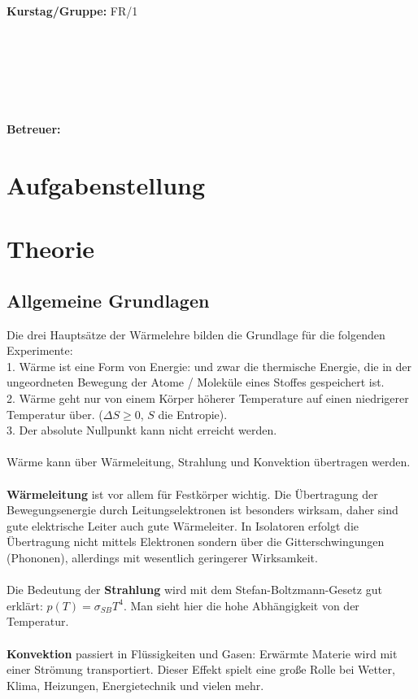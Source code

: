 \documentclass[12pt,a4paper,twopage]{article}
\begin{document}
\begin{verbatim}


\end{verbatim}
			\begin{flushleft}
			\textbf{\Large{Kurstag/Gruppe:}} \Large{FR/1}
			\end{flushleft}

\begin{verbatim}






\end{verbatim}
			\begin{flushleft}
			\LARGE{\textbf{Betreuer:\Large{ }}}		
			\end{flushleft}
			
\section{Aufgabenstellung}

\section{Theorie}
\subsection{Allgemeine Grundlagen}
Die drei Hauptsätze der Wärmelehre bilden die Grundlage für die folgenden Experimente:\\
1. Wärme ist eine Form von Energie: und zwar die thermische Energie, die in der ungeordneten Bewegung der Atome / Moleküle eines Stoffes gespeichert ist.\\
2. Wärme geht nur von einem Körper höherer Temperature auf einen niedrigerer Temperatur über. ($\Delta S \geq 0$, $S$ die Entropie).\\
3. Der absolute Nullpunkt kann nicht erreicht werden.\\
\\
Wärme kann über Wärmeleitung, Strahlung und Konvektion übertragen werden.\\
\\
\textbf{Wärmeleitung} ist vor allem für Festkörper wichtig. Die Übertragung der Bewegungsenergie durch Leitungselektronen ist besonders wirksam, daher sind gute elektrische Leiter auch gute Wärmeleiter. In Isolatoren erfolgt die Übertragung nicht mittels Elektronen sondern über die Gitterschwingungen (Phononen), allerdings mit wesentlich geringerer Wirksamkeit.\\
\\
Die Bedeutung der \textbf{Strahlung} wird mit dem Stefan-Boltzmann-Gesetz gut erklärt: $p(T)=\sigma_{SB} T^4$. Man sieht hier die hohe Abhängigkeit von der Temperatur.\\
\\
\textbf{Konvektion} passiert in Flüssigkeiten und Gasen: Erwärmte Materie wird mit einer Strömung transportiert. Dieser Effekt spielt eine große Rolle bei Wetter, Klima, Heizungen, Energietechnik und vielen mehr. 
\end{document}
